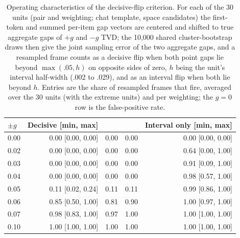 \begin{table}[t]
\centering\scriptsize
\setlength{\tabcolsep}{2.5pt}
\begin{tabular}{@{}lrrrr@{}}
\toprule
$\pm g$ & Decisive [min, max] & \ES{} & \PC{} & Interval only [min, max] \\
\midrule
0.00 & 0.00 [0.00, 0.00] & 0.00 & 0.00 & 0.00 [0.00, 0.00] \\
0.02 & 0.00 [0.00, 0.00] & 0.00 & 0.00 & 0.64 [0.00, 1.00] \\
0.03 & 0.00 [0.00, 0.00] & 0.00 & 0.00 & 0.91 [0.09, 1.00] \\
0.04 & 0.00 [0.00, 0.00] & 0.00 & 0.00 & 0.98 [0.57, 1.00] \\
0.05 & 0.11 [0.02, 0.24] & 0.11 & 0.11 & 0.99 [0.86, 1.00] \\
0.06 & 0.85 [0.50, 1.00] & 0.81 & 0.90 & 1.00 [0.97, 1.00] \\
0.07 & 0.98 [0.83, 1.00] & 0.97 & 1.00 & 1.00 [1.00, 1.00] \\
0.10 & 1.00 [1.00, 1.00] & 1.00 & 1.00 & 1.00 [1.00, 1.00] \\
\bottomrule
\end{tabular}
\caption{Operating characteristics of the decisive-flip criterion. For each of the 30 units (pair and weighting; chat template, space candidates) the first-token and summed per-item gap vectors are centered and shifted to true aggregate gaps of $+g$ and $-g$ TVD; the 10,000 shared cluster-bootstrap draws then give the joint sampling error of the two aggregate gaps, and a resampled frame counts as a decisive flip when both point gaps lie beyond $\max(.05,h)$ on opposite sides of zero, $h$ being the unit's interval half-width (.002 to .029), and as an interval flip when both lie beyond $h$. Entries are the share of resampled frames that fire, averaged over the 30 units (with the extreme units) and per weighting; the $g=0$ row is the false-positive rate.}
\label{tab:power}
\end{table}
